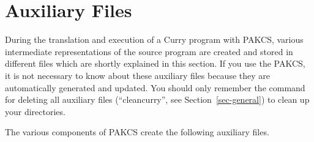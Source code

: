 \documentclass[11pt,fleqn]{article}
\renewcommand{\tt}{\usefont{OT1}{cmtt}{m}{n}\selectfont}
\newcommand{\codefont}{\tt}
\newcommand{\ccode}[1]{``\mbox{\codefont #1}''}
\begin{document}
\newpage

\section{Auxiliary Files}
\label{sec-auxfiles}

During the translation and execution of a Curry program with PAKCS,
various intermediate representations of the source program are created
and stored in different files which are shortly explained in this section.
If you use the PAKCS, it is not necessary to know about
these auxiliary files because they are automatically generated
and updated. You should only remember the command for deleting
all auxiliary files (\ccode{cleancurry}, see Section~\ref{sec-general})
to clean up your directories.

The various components of PAKCS create
the following auxiliary files.
\end{document}
